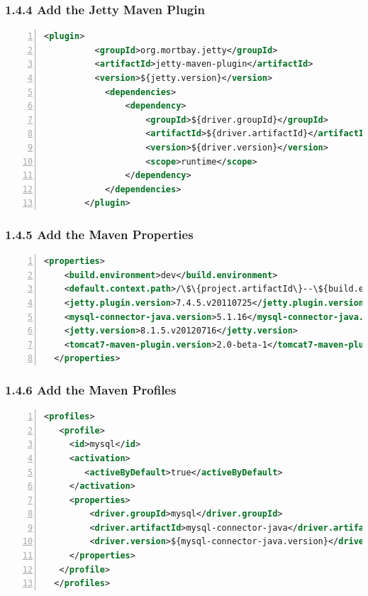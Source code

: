 \subsubsection*{1.4.4 Add the Jetty Maven Plugin}
\begin{lstlisting}[numbers=left,language=xml,basicstyle=\scriptsize,backgroundcolor=\color{ubergray},caption={training/pom.xml},frame=single,breaklines=true]
        <plugin>
          <groupId>org.mortbay.jetty</groupId>
          <artifactId>jetty-maven-plugin</artifactId>
          <version>${jetty.version}</version>
            <dependencies>
                <dependency>
                    <groupId>${driver.groupId}</groupId>
                    <artifactId>${driver.artifactId}</artifactId>
                    <version>${driver.version}</version>
                    <scope>runtime</scope>
                </dependency>
            </dependencies>
        </plugin>
\end{lstlisting}

\subsubsection*{1.4.5 Add the Maven Properties}
\begin{lstlisting}[numbers=left,language=xml,basicstyle=\scriptsize,backgroundcolor=\color{ubergray},caption={training/pom.xml},frame=single,breaklines=true
]
  <properties>
    <build.environment>dev</build.environment>
    <default.context.path>/\$\{project.artifactId\}--\${build.environment\}</default.context.path>
    <jetty.plugin.version>7.4.5.v20110725</jetty.plugin.version>
    <mysql-connector-java.version>5.1.16</mysql-connector-java.version>
    <jetty.version>8.1.5.v20120716</jetty.version>
    <tomcat7-maven-plugin.version>2.0-beta-1</tomcat7-maven-plugin.version>
  </properties>
\end{lstlisting}

\subsubsection*{1.4.6 Add the Maven Profiles}
\begin{lstlisting}[numbers=left,language=xml,basicstyle=\scriptsize,backgroundcolor=\color{ubergray},caption={training/pom.xml},frame=single,breaklines=true
]
  <profiles>
   <profile>
     <id>mysql</id>
     <activation>
        <activeByDefault>true</activeByDefault>
     </activation>
     <properties>
         <driver.groupId>mysql</driver.groupId>
         <driver.artifactId>mysql-connector-java</driver.artifactId>
         <driver.version>${mysql-connector-java.version}</driver.version>
     </properties>
   </profile>
  </profiles>
\end{lstlisting}

